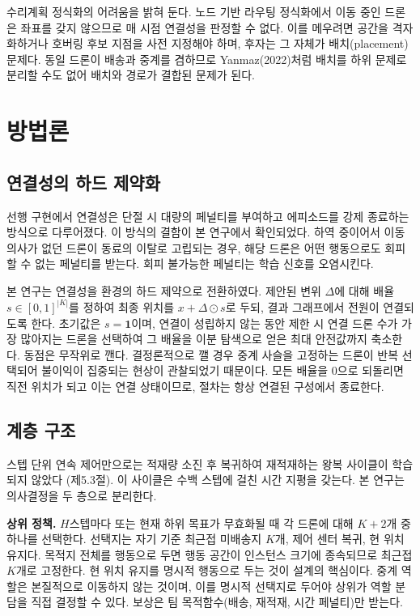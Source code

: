 \documentclass[12pt]{article}
\begin{document}
수리계획 정식화의 어려움을 밝혀 둔다. 노드 기반 라우팅 정식화에서 이동 중인 드론은 좌표를
갖지 않으므로 매 시점 연결성을 판정할 수 없다. 이를 메우려면 공간을 격자화하거나 호버링 후보
지점을 사전 지정해야 하며, 후자는 그 자체가 배치(placement) 문제다. 동일 드론이 배송과 중계를
겸하므로 Yanmaz(2022)처럼 배치를 하위 문제로 분리할 수도 없어 배치와 경로가 결합된 문제가 된다.

\section{방법론}

\subsection{연결성의 하드 제약화}

선행 구현에서 연결성은 단절 시 대량의 페널티를 부여하고 에피소드를 강제 종료하는 방식으로
다루어졌다. 이 방식의 결함이 본 연구에서 확인되었다. 하역 중이어서 이동 의사가 없던 드론이
동료의 이탈로 고립되는 경우, 해당 드론은 어떤 행동으로도 회피할 수 없는 페널티를 받는다.
회피 불가능한 페널티는 학습 신호를 오염시킨다.

본 연구는 연결성을 환경의 하드 제약으로 전환하였다. 제안된 변위 $\Delta$에 대해 배율
$s \in [0,1]^{|K|}$를 정하여 최종 위치를 $x + \Delta \odot s$로 두되, 결과 그래프에서 전원이
연결되도록 한다. 초기값은 $s = \mathbf{1}$이며, 연결이 성립하지 않는 동안 제한 시 연결 드론 수가
가장 많아지는 드론을 선택하여 그 배율을 이분 탐색으로 얻은 최대 안전값까지 축소한다. 동점은
무작위로 깬다. 결정론적으로 깰 경우 중계 사슬을 고정하는 드론이 반복 선택되어 불이익이
집중되는 현상이 관찰되었기 때문이다. 모든 배율을 0으로 되돌리면 직전 위치가 되고 이는 연결
상태이므로, 절차는 항상 연결된 구성에서 종료한다.

\subsection{계층 구조}

스텝 단위 연속 제어만으로는 적재량 소진 후 복귀하여 재적재하는 왕복 사이클이 학습되지 않았다
(제5.3절). 이 사이클은 수백 스텝에 걸친 시간 지평을 갖는다. 본 연구는 의사결정을 두 층으로
분리한다.

\textbf{상위 정책.} $H$스텝마다 또는 현재 하위 목표가 무효화될 때 각 드론에 대해 $K+2$개 중
하나를 선택한다. 선택지는 자기 기준 최근접 미배송지 $K$개, 제어 센터 복귀, 현 위치 유지다.
목적지 전체를 행동으로 두면 행동 공간이 인스턴스 크기에 종속되므로 최근접 $K$개로 고정한다.
현 위치 유지를 명시적 행동으로 두는 것이 설계의 핵심이다. 중계 역할은 본질적으로 이동하지
않는 것이며, 이를 명시적 선택지로 두어야 상위가 역할 분담을 직접 결정할 수 있다.
보상은 팀 목적함수(배송, 재적재, 시간 페널티)만 받는다.
\end{document}
